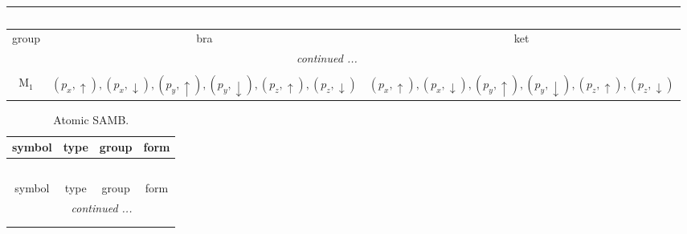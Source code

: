 \documentclass[fleqn,10pt,landscape]{article}
\begin{document}
\begin{itemize}
\begin{center}
\begin{longtable}{c|c|c}
\multicolumn{2}{l}{\tablename\ \thetable{}} \\
 \hline \hline
group & bra & ket \\ \hline \endhead

 \hline \hline
\multicolumn{2}{r}{\footnotesize\it continued ...} \\ \endfoot

 \hline \hline
\multicolumn{2}{r}{} \\ \endlastfoot

M$_{1}$ & $(p_{x},\uparrow), (p_{x},\downarrow), (p_{y},\uparrow), (p_{y},\downarrow), (p_{z},\uparrow), (p_{z},\downarrow)$ & $(p_{x},\uparrow), (p_{x},\downarrow), (p_{y},\uparrow), (p_{y},\downarrow), (p_{z},\uparrow), (p_{z},\downarrow)$ \\
\end{longtable}
\end{center}
\begin{center}
\renewcommand{\arraystretch}{1.3}
\begin{longtable}{c|c|c|c}
\caption{Atomic SAMB.}
 \\
 \hline \hline
symbol & type & group & form \\ \hline \endfirsthead

\multicolumn{3}{l}{\tablename\ \thetable{}} \\
 \hline \hline
symbol & type & group & form \\ \hline \endhead

 \hline \hline
\multicolumn{3}{r}{\footnotesize\it continued ...} \\ \endfoot

 \hline \hline
\multicolumn{3}{r}{} \\ \endlastfoot


\end{longtable}
\end{center}
\end{itemize}
\end{document}

